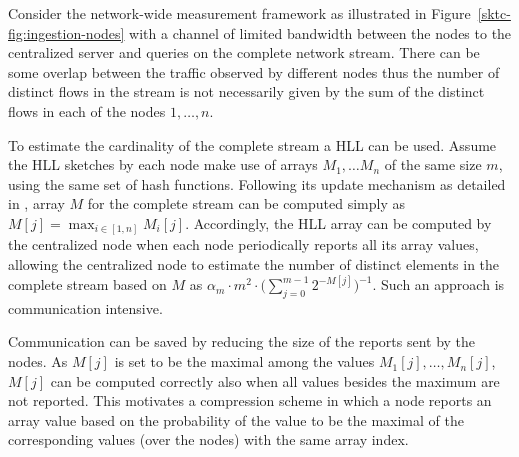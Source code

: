 Consider the network-wide measurement framework as illustrated in Figure~\ref{sktc-fig:ingestion-nodes} with a channel of limited bandwidth between the nodes to the centralized server and queries on the complete network stream. There can be some overlap between the traffic observed by different nodes thus the number of distinct flows in the stream is not necessarily given by the sum of the distinct flows in each of the nodes $1,\ldots,n$. 

To estimate the cardinality of the complete stream a HLL can be used. Assume the HLL sketches by each node make use of arrays $M_1, \ldots M_n$  of the same size $m$, using the same set of hash functions. Following its update mechanism as detailed in ,  array $M$ for the complete stream can be computed simply as $M[j] = \max_{i \in [1,n]} M_i[j]$. Accordingly, the HLL array can be computed by the centralized node when each node periodically reports all its array values, allowing the centralized node to estimate the number of distinct elements in the complete stream based on $M$ as $\alpha_m  \cdot m^2 \cdot \big(\sum_{j = 0}^{m-1} {2^{-M[j]}}\big)^{-1}$. Such an approach is communication intensive. 

Communication can be saved by reducing the size of the reports sent by the nodes. As $M[j]$ is set to be the maximal among the values $M_1[j], \ldots, M_n[j]$,  $M[j]$ can be computed correctly also when all values besides the maximum are not reported. This motivates a compression scheme in which a node reports an array value based on the probability of the value to be the maximal of the corresponding values  (over the nodes) with the same array index. 


